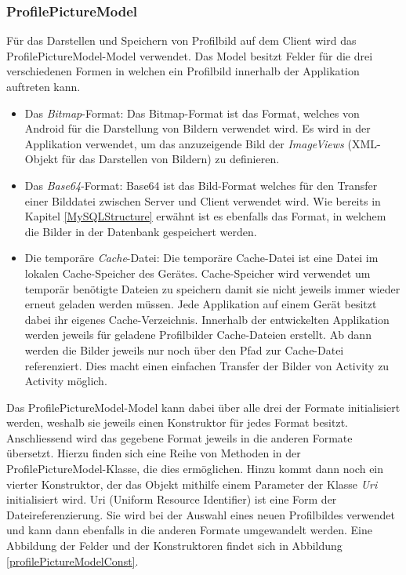 \documentclass[../main.tex]{subfiles}
\begin{document}
	\subsubsection{ProfilePictureModel}
	Für das Darstellen und Speichern von Profilbild auf dem Client wird das ProfilePictureModel-Model verwendet. Das Model besitzt Felder für die drei verschiedenen Formen in welchen ein Profilbild innerhalb der Applikation auftreten kann.
	
	\begin{itemize}
		\item Das \emph{Bitmap}-Format: Das Bitmap-Format ist das Format, welches von Android für die Darstellung von Bildern verwendet wird. Es wird in der Applikation verwendet, um das anzuzeigende Bild der \emph{ImageViews} (XML-Objekt für das Darstellen von Bildern) zu definieren.
		\item Das \emph{Base64}-Format: Base64 ist das Bild-Format welches für den Transfer einer Bilddatei zwischen Server und Client verwendet wird. Wie bereits in Kapitel \ref{MySQLStructure} erwähnt ist es ebenfalls das Format, in welchem die Bilder in der Datenbank gespeichert werden.
		\item Die temporäre \emph{Cache}-Datei: Die temporäre Cache-Datei ist eine Datei im lokalen Cache-Speicher des Gerätes. Cache-Speicher wird verwendet um temporär benötigte Dateien zu speichern damit sie nicht jeweils immer wieder erneut geladen werden müssen. Jede Applikation auf einem Gerät besitzt dabei ihr eigenes Cache-Verzeichnis. Innerhalb der entwickelten Applikation werden jeweils für geladene Profilbilder Cache-Dateien erstellt. Ab dann werden die Bilder jeweils nur noch über den Pfad zur Cache-Datei referenziert. Dies macht einen einfachen Transfer der Bilder von Activity zu Activity möglich. \cite{cache}
	\end{itemize}

	Das ProfilePictureModel-Model kann dabei über alle drei der Formate initialisiert werden, weshalb sie jeweils einen Konstruktor für jedes Format besitzt. Anschliessend wird das gegebene Format jeweils in die anderen Formate übersetzt. Hierzu finden sich eine Reihe von Methoden in der ProfilePictureModel-Klasse, die dies ermöglichen. Hinzu kommt dann noch ein vierter Konstruktor, der das Objekt mithilfe einem Parameter der Klasse \emph{Uri} initialisiert wird. Uri (Uniform Resource Identifier) ist eine Form der Dateireferenzierung. Sie wird bei der Auswahl eines neuen Profilbildes verwendet und kann dann ebenfalls in die anderen Formate umgewandelt werden. Eine Abbildung der Felder und der Konstruktoren findet sich in Abbildung \ref{profilePictureModelConst}.
	
\end{document}
